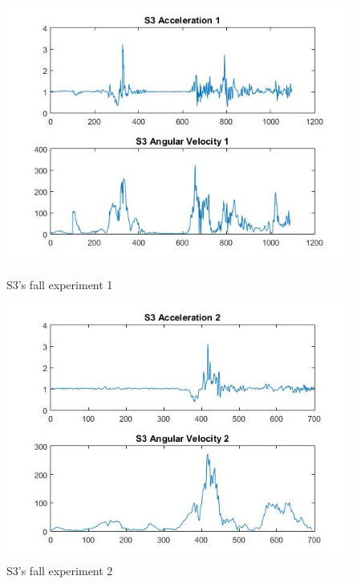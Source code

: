 \documentclass[letterpaper,12pt,titlepage,oneside,final]{book}
\begin{document}
\begin{figure}[h!]
	\centering
	\hspace{-1cm}
	\begin{minipage}[b]{0.5\textwidth}
		\centering
		\includegraphics[scale=0.42]{S3_1}
		\caption{S3's fall experiment 1}
	\end{minipage}%
	\hfill
	\begin{minipage}[b]{0.5\textwidth}
		\centering
		\includegraphics[scale=0.42]{S3_2}
		\caption{S3's fall experiment 2}
	\end{minipage}	
\end{figure}
\end{document}
